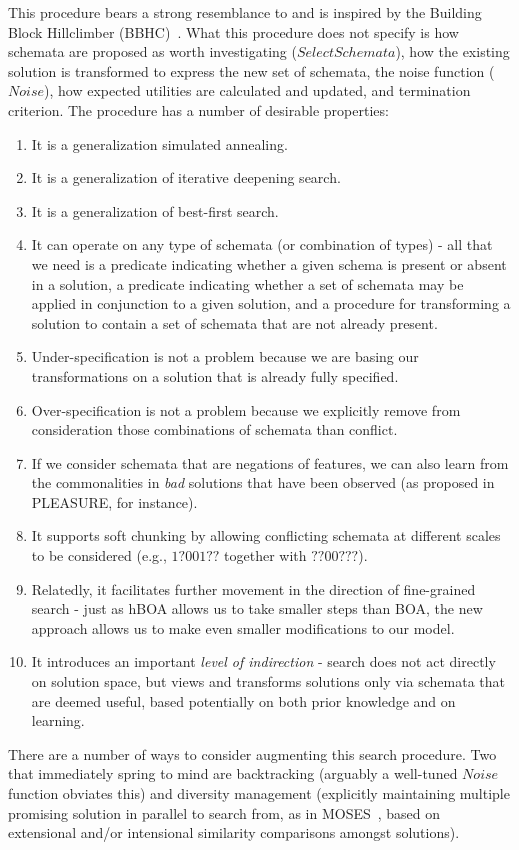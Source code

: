 \documentclass[letterpaper]{article}
\begin{document}
This procedure bears a strong resemblance to and is inspired by the Building
Block Hillclimber (BBHC)~\cite{Iclanzan}. What this procedure does not specify
is how schemata are proposed as worth investigating ($SelectSchemata$), how the
existing solution is transformed to express the new set of schemata, the noise
function ($Noise$), how expected utilities are calculated and updated, and
termination criterion. The procedure has a number of desirable properties:
\begin{enumerate}
\item It is a generalization simulated annealing.
\item It is a generalization of iterative deepening search.
\item It is a generalization of best-first search.
\item It can operate on any type of schemata (or combination of types) - all
  that we need is a predicate indicating whether a given schema is present or
  absent in a solution, a predicate indicating whether a set of schemata may be
  applied in conjunction to a given solution, and a procedure for transforming
  a solution to contain a set of schemata that are not already present.
\item Under-specification is not a problem because we are basing our
  transformations on a solution that is already fully specified.
\item Over-specification is not a problem because we explicitly remove from
  consideration those combinations of schemata than conflict.
\item If we consider schemata that are negations of features, we can also learn
  from the commonalities in \emph{bad} solutions that have been observed (as
  proposed in PLEASURE, for instance).
\item It supports soft chunking by allowing conflicting schemata at different
  scales to be considered (e.g., $1?001??$ together with $??00???$). 
\item Relatedly, it facilitates further movement in the direction of
  fine-grained search - just as hBOA allows us to take smaller steps than BOA,
  the new approach allows us to make even smaller modifications to our model.
\item It introduces an important \emph{level of indirection} - search does not
  act directly on solution space, but views and transforms solutions only via
  schemata that are deemed useful, based potentially on both prior knowledge
  and on learning.
\end{enumerate}

There are a number of ways to consider augmenting this search procedure. Two
that immediately spring to mind are backtracking (arguably a well-tuned $Noise$
function obviates this) and diversity management (explicitly maintaining
multiple promising solution in parallel to search from, as in MOSES~\cite{Me},
based on extensional and/or intensional similarity comparisons amongst
solutions).



\end{document}
